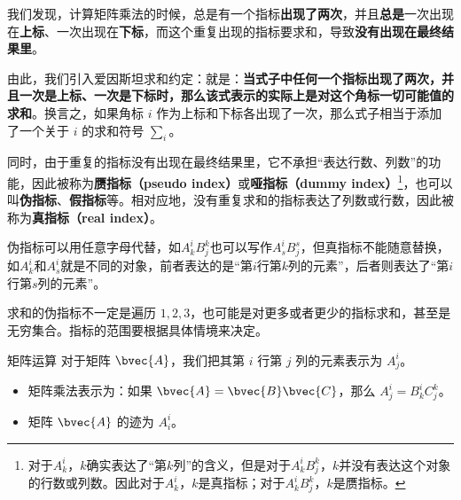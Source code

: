 我们发现，计算矩阵乘法的时候，总是有一个指标\textbf{出现了两次}，并且\textbf{总是}一次出现在\textbf{上标}、一次出现在\textbf{下标}，而这个重复出现的指标要求和，导致\textbf{没有出现在最终结果里}。

由此，我们引入爱因斯坦求和约定：就是：\textbf{当式子中任何一个指标出现了两次，并且一次是上标、一次是下标时，那么该式表示的实际上是对这个角标一切可能值的求和}。换言之，如果角标 $i$ 作为上标和下标各出现了一次，那么式子相当于添加了一个关于 $i$ 的求和符号 $\sum_i$。


同时，由于重复的指标没有出现在最终结果里，它不承担“表达行数、列数”的功能，因此被称为\textbf{赝指标（pseudo index）}或\textbf{哑指标（dummy index）}\footnote{对于$A^i_k$，$k$确实表达了“第$k$列”的含义，但是对于$A^i_kB^k_j$，$k$并没有表达这个对象的行数或列数。因此对于$A^i_k$，$k$是真指标；对于$A^i_kB^k_j$，$k$是赝指标。}，也可以叫\textbf{伪指标}、\textbf{假指标}等。相对应地，没有重复求和的指标表达了列数或行数，因此被称为\textbf{真指标（real index）}。



伪指标可以用任意字母代替，如$A^i_kB^k_j$也可以写作$A^i_sB^s_j$，但真指标不能随意替换，如$A^i_k$和$A^i_s$就是不同的对象，前者表达的是“第$i$行第$k$列的元素”，后者则表达了“第$i$行第$s$列的元素”。

求和的伪指标不一定是遍历 $1, 2, 3$，也可能是对更多或者更少的指标求和，甚至是无穷集合。指标的范围要根据具体情境来决定。



\begin{example}{矩阵运算}
对于矩阵 $\bvec{A}$，我们把其第 $i$ 行第 $j$ 列的元素表示为 $A^i_j$。
\begin{itemize}
\item 矩阵乘法表示为：如果 $\bvec{A}=\bvec{B}\bvec{C}$，那么 $A^i_j=B^i_k C^k_j$。
\item 矩阵 $\bvec{A}$ 的迹为 $A^i_i$。

\end{itemize}
\end{example}



